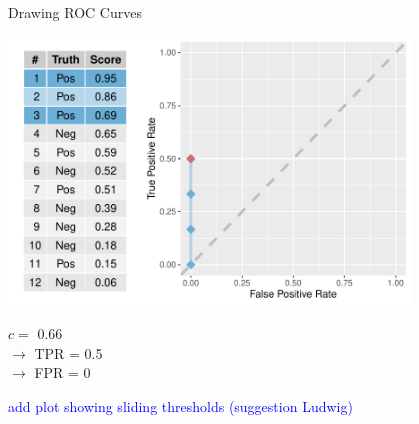 \begin{vbframe}{Drawing ROC Curves}

\begin{knitrout}\scriptsize
{}\color{fgcolor}

{
\includegraphics[width=0.8\textwidth]{figure/eval_mclass_roc_sp_7}
}

\end{knitrout}

\vfill

\begin{minipage}[b]{0.3\textwidth}
  $c =$ 0.66\\ 
  $\rightarrow$ TPR = 0.5 \\
  $\rightarrow$ FPR = 0
\end{minipage}%
\begin{minipage}[b]{0.7\textwidth}
  \textcolor{blue}{add plot showing sliding thresholds (suggestion Ludwig)}
\end{minipage}

\end{vbframe}


